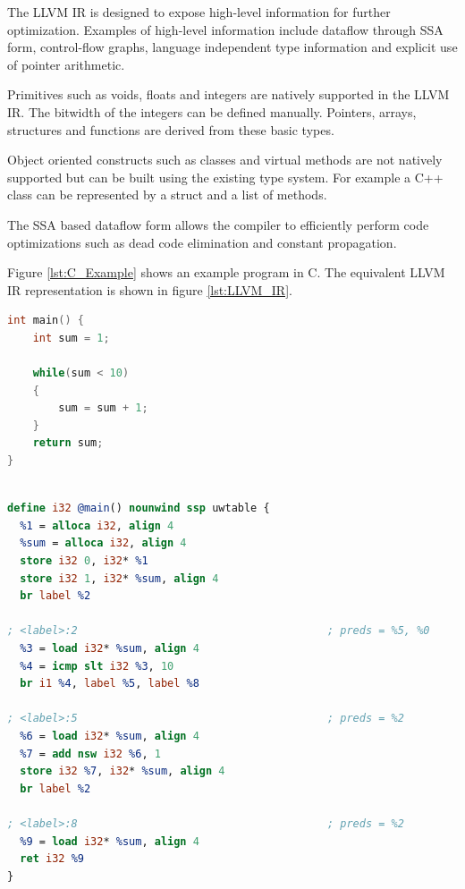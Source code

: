 The LLVM IR is designed to expose high-level information for further optimization. Examples of high-level information include dataflow through SSA form, control-flow graphs, language independent type information and explicit use of pointer arithmetic. 

Primitives such as voids, floats and integers are natively supported in the LLVM IR. The bitwidth of the integers can be defined manually. Pointers, arrays, structures and functions are derived from these basic types.

Object oriented constructs such as classes and virtual methods are not natively supported but can be built using the existing type system. For example a C++ class can be represented by a struct and a list of methods. 

The SSA based dataflow form allows the compiler to efficiently perform code optimizations such as dead code elimination and constant propagation. 

Figure \ref{lst:C_Example} shows an example program in C. The equivalent LLVM IR representation is shown in figure \ref{lst:LLVM_IR}.

\lstset{numbers=none, captionpos=b}
\begin{lstlisting}[language=C,caption={C example program},label=lst:C_Example]
int main() {
	int sum = 1;

	while(sum < 10)
	{
		sum = sum + 1;
	}
	return sum;
}
\end{lstlisting}


\lstset{numbers=none, captionpos=b}
\begin{lstlisting}[language=llvm,caption={LLVM Intermediate representation},label=lst:LLVM_IR]

define i32 @main() nounwind ssp uwtable {
  %1 = alloca i32, align 4
  %sum = alloca i32, align 4
  store i32 0, i32* %1
  store i32 1, i32* %sum, align 4
  br label %2

; <label>:2                                       ; preds = %5, %0
  %3 = load i32* %sum, align 4
  %4 = icmp slt i32 %3, 10
  br i1 %4, label %5, label %8

; <label>:5                                       ; preds = %2
  %6 = load i32* %sum, align 4
  %7 = add nsw i32 %6, 1
  store i32 %7, i32* %sum, align 4
  br label %2

; <label>:8                                       ; preds = %2
  %9 = load i32* %sum, align 4
  ret i32 %9
}

\end{lstlisting}

